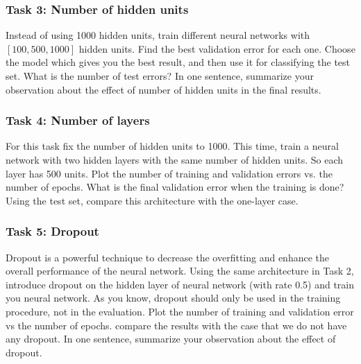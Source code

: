 \documentclass[12pt]{article}
\begin{document}
\subsubsection*{Task 3: Number of hidden units}
Instead of using 1000 hidden units, train different neural networks with $[100, 500, 1000]$ hidden units. Find the best validation error for each one. Choose the model which gives you the best result, and then use it for classifying the test set. What is the number of test errors? In one sentence, summarize your observation about the effect of number of hidden units in the final results.

\subsubsection*{Task 4: Number of layers}
For this task fix the number of hidden units to 1000. This time, train a neural network with two hidden layers with the same number of hidden units. So each layer has 500 units. Plot the number of training and validation errors vs. the number of epochs. What is the final validation error when the training is done? Using the test set, compare this architecture with the one-layer case.

\subsubsection*{Task 5: Dropout}
Dropout is a powerful technique to decrease the overfitting and enhance the overall performance of the neural network. Using the same architecture in Task 2, introduce dropout on the hidden layer of neural network (with rate 0.5) and train you neural network. As you know, dropout should only be used in the training procedure, not in the evaluation. Plot the number of training and validation error vs the number of epochs. compare the results with the case that we do not have any dropout. In one sentence, summarize your observation about the effect of dropout. 
\end{document}

